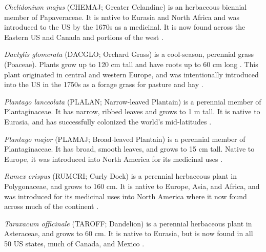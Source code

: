 \documentclass[12pt]{article}\usepackage[]{graphicx}\usepackage[]{color}
\begin{document}
	\textit{Chelidonium majus} (CHEMAJ; Greater Celandine) is an herbaceous biennial member of Papaveraceae. It is native to Eurasia and North Africa and was introduced to the US by the 1670s as a medicinal. It is now found across the Eastern US and Canada and portions of the west \parencite{Holm1979}. 
	
	\textit{Dactylis glomerata} (DACGLO; Orchard Grass) is a cool-season, perennial grass (Poaceae). Plants grow up to 120 cm tall and have roots up to 60 cm long \parencite{Moser1996}. This plant originated in central and western Europe, and was intentionally introduced into the US in the 1750s \parencite{Bush2012} as a forage grass for pasture and hay \parencite{Ogle2011}.  
	
	\textit{Plantago lanceolata} (PLALAN; Narrow-leaved Plantain) is a perennial member of  Plantaginaceae. It has narrow, ribbed leaves and grows to 1 m tall. It is native to Eurasia, and has successfully colonized the world's mid-latitudes \parencite{Holm1977}.
	
	\textit{Plantago major} (PLAMAJ; Broad-leaved Plantain) is a perennial member of Plantaginaceae. It has broad, smooth leaves, and grows to 15 cm tall. Native to Europe, it was introduced into North America for its medicinal uses \parencite{Knobloch1996,Samuelsen2000}.
	
	\textit{Rumex crispus} (RUMCRI; Curly Dock) is a perennial herbaceous plant in Polygonaceae, and grows to 160 cm. It is native to Europe, Asia, and Africa, and was introduced for its medicinal uses into North America where it now found across much of the continent \parencite{USDA2010}. 
	
	\textit{Taraxacum officinale} (TAROFF; Dandelion) is a perennial herbaceous plant in Asteraceae, and grows to 60 cm. It is native to Eurasia, but is now found in all 50 US states, much of Canada, and Mexico \parencite{USDA1971}.
\end{document}
